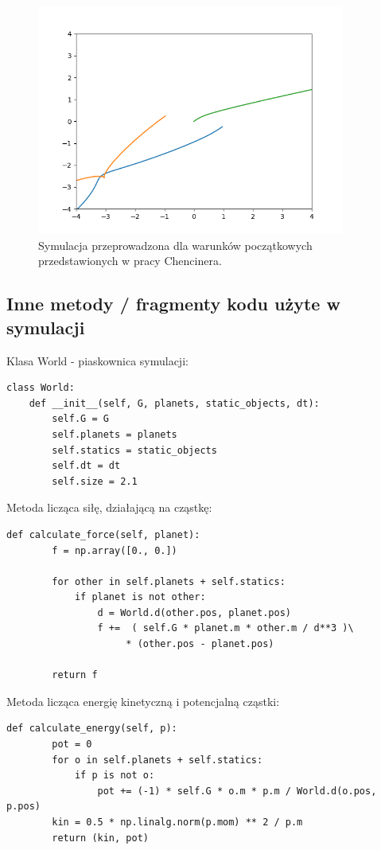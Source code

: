 \documentclass[10pt,a4paper]{article}
\begin{document}
\begin{figure}[htp!!!!!!!]	
		\begin{center}
			\includegraphics[width = 0.9\textwidth]{osemka_chencinera.png}
			\caption{Symulacja przeprowadzona dla warunków początkowych przedstawionych
					w pracy Chencinera.}
			\label{schemat}
		\end{center}
	\end{figure} 
		
	
\subsection*{Inne metody / fragmenty kodu użyte w symulacji}
Klasa World - piaskownica symulacji:
\begin{lstlisting}
class World:
	def __init__(self, G, planets, static_objects, dt):
		self.G = G
		self.planets = planets
		self.statics = static_objects
		self.dt = dt
		self.size = 2.1
\end{lstlisting}	
	
Metoda licząca siłę, działającą na cząstkę:	
	
\begin{lstlisting}
def calculate_force(self, planet):
        f = np.array([0., 0.])

        for other in self.planets + self.statics:
            if planet is not other:
                d = World.d(other.pos, planet.pos)
                f +=  ( self.G * planet.m * other.m / d**3 )\
                     * (other.pos - planet.pos)

        return f
\end{lstlisting}	
	
Metoda licząca energię kinetyczną i potencjalną cząstki:
\begin{lstlisting}
def calculate_energy(self, p):
        pot = 0
        for o in self.planets + self.statics:
            if p is not o:
                pot += (-1) * self.G * o.m * p.m / World.d(o.pos, p.pos)
        kin = 0.5 * np.linalg.norm(p.mom) ** 2 / p.m
        return (kin, pot)
\end{lstlisting}	
\end{document}
